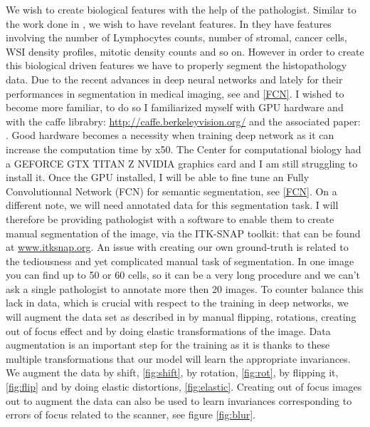 \documentclass[a4paper,10pt]{article}
\begin{document}
We wish to create biological features with the help of the pathologist. Similar to the work done in \cite{yuan2012quantitative}, we wish to have revelant features. In \citep{yuan2012quantitative} they have features involving the number of Lymphocytes counts, number of stromal, cancer cells, WSI density profiles, mitotic density counts and so on. However in order to create this biological driven features we have to properly segment the histopathology data. Due to the recent advances in deep neural networks and lately for their performances in segmentation in medical imaging, see \cite{UNet} and \ref{FCN}. I wished to become more familiar, to do so I familiarized myself with GPU hardware and with the caffe librabry: \url{http://caffe.berkeleyvision.org/} and the associated paper: \cite{jia2014caffe}. Good hardware becomes a necessity when training deep network as it can increase the computation time by x50. The Center for computational biology had a GEFORCE GTX TITAN Z NVIDIA graphics card and I am still struggling to install it. 
Once the GPU installed, I will be able to fine tune an Fully Convolutionnal Network (FCN) for semantic segmentation, see \ref{FCN}. On a different note, we will need annotated data for this segmentation task. I will therefore be providing pathologist with a software to enable them to create manual segmentation of the image, via the ITK-SNAP toolkit: \cite{py06nimg} that can be found at \url{www.itksnap.org}. An issue with creating our own ground-truth is related to the tediousness and yet complicated manual task of segmentation. In one image you can find up to 50 or 60 cells, so it can be a very long procedure and we can't ask a single pathologist to annotate more then 20 images. To counter balance this lack in data, which is crucial with respect to the training in deep networks, we will augment the data set as described in \cite{UNet} by manual flipping, rotations, creating out of focus effect and by doing elastic transformations of the image. Data augmentation is an important step for the training as it is thanks to these multiple transformations that our model will learn the appropriate invariances. We augment the data by shift, \ref{fig:shift}, by rotation, \ref{fig:rot}, by flipping it, \ref{fig:flip} and by doing elastic distortions, \ref{fig:elastic}. Creating out of focus images out to augment the data can also be used to learn invariances corresponding to errors of focus related to the scanner, see figure \ref{fig:blur}.
\end{document}
